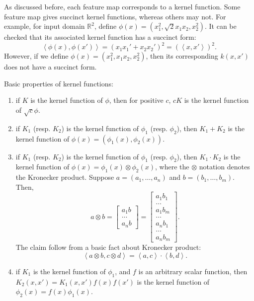 \documentclass{article}
\newcommand{\RR}{\mathbb{R}} %
\newcommand{\inner}[2]{\left\langle #1,#2 \right\rangle}
\begin{document}
As discussed before, each feature map corresponds to a kernel function. Some feature map gives succinct kernel functions, whereas others may not. For example, for input domain $\RR^2$, define $\phi(x) = (x_1^2, \sqrt{2} x_1 x_2, x_2^2)$. It can be checked that its associated kernel function has a succinct form:
\[ \inner{\phi(x)}{\phi(x')} = (x_1x_1' + x_2x_2')^2 = (\inner{x}{x'})^2. \]
However, if we define $\phi(x) = (x_1^2, x_1 x_2, x_2^2)$, then its corresponding
$k(x,x')$ does not have a succinct form.

Basic properties of kernel functions:
\begin{enumerate}
\item if $K$ is the kernel function of $\phi$, then for positive $c$, $cK$ is the kernel function of $\sqrt{c} \phi$.
\item if $K_1$ (resp. $K_2$) is the kernel function of $\phi_1$ (resp. $\phi_2$), then $K_1 + K_2$ is the kernel function of $\phi(x) = (\phi_1(x), \phi_2(x))$.
\item if $K_1$ (resp. $K_2$) is the kernel function of $\phi_1$ (resp. $\phi_2$), then $K_1 \cdot K_2$ is the kernel function of $\phi(x) = \phi_1(x) \otimes \phi_2(x)$, where the $\otimes$ notation denotes the Kronecker product. Suppose $a = (a_1,\ldots,a_n)$ and $b = (b_1,\ldots,b_m)$. Then,
\[ a \otimes b = \begin{bmatrix} a_1 b \\ \ldots \\ a_n b \end{bmatrix} = \begin{bmatrix} a_1 b_1\\ \ldots \\ a_1 b_m \\ \ldots \\ a_n b_1 \\ \ldots \\ a_n b_m \end{bmatrix}. \]
The claim follow from a basic fact about Kronecker product:
\[ \inner{a \otimes b}{c \otimes d} = \inner{a}{c} \cdot \inner{b}{d}. \]
\item if $K_1$ is the kernel function of $\phi_1$, and $f$ is an arbitrary scalar function, then $K_2(x,x') = K_1(x,x') f(x) f(x')$ is the kernel function of $\phi_2(x) = f(x) \phi_1(x)$.
\end{enumerate}
\end{document}
